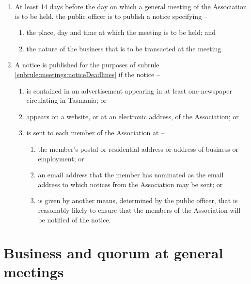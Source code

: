 \documentclass[a4paper,11pt]{article}
\begin{document}
\begin{enumerate}
	\item \label{subrule:meetings:noticeDeadlines} At least 14 days before the day on which a general meeting of the Association is to be held, the public officer is to publish a notice specifying --
		\begin{enumerate}
			\item the place, day and time at which the meeting is to be held; and
			\item the nature of the business that is to be transacted at the meeting.
		\end{enumerate}
	
	\item \label{subrule:meetings:noticeRequirements} A notice is published for the purposes of subrule \ref{subrule:meetings:noticeDeadlines} if the notice --
	\begin{enumerate}
		\item is contained in an advertisement appearing in at least one newspaper circulating in Tasmania; or
		\item appears on a website, or at an electronic address, of the Association; or
		\item is sent to each member of the Association at --
		\begin{enumerate}
			\item the member's postal or residential address or address of business or employment; or
			\item an email address that the member has nominated as the email address to which notices from the Association may be sent; or
			\item is given by another means, determined by the public officer, that is reasonably likely to ensure that the members of the Association will be notified of the notice.
		\end{enumerate}
	\end{enumerate}
\end{enumerate}

\section{Business and quorum at general meetings}
\label{rule:quorum}
\end{document}
